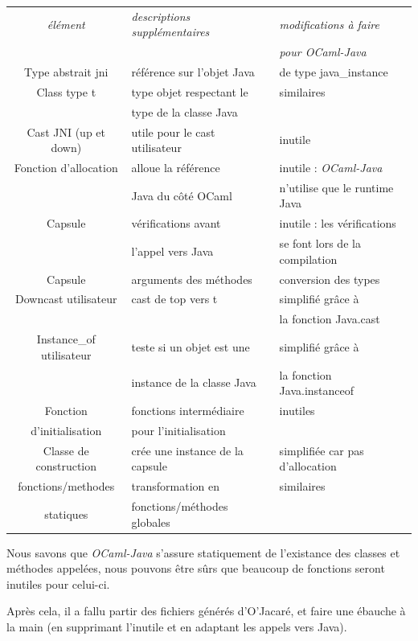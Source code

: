 \documentclass[a4paper, 11pt]{article}
\begin{document}
\begin{tabular}{|c|l|l|}
  \hline
  \emph{élément} & \emph{descriptions supplémentaires} & \emph{modifications à faire}\\
  & & \emph{pour OCaml-Java} \\
  \hline
  Type abstrait jni & référence sur l'objet Java & de type java\_instance\\
  \hline
  Class type t & type objet respectant le & similaires\\
  & type de la classe Java & \\
  \hline
  Cast JNI (up et down) & utile pour le cast utilisateur & inutile\\
  \hline
  Fonction d'allocation & alloue la référence & inutile : \emph{OCaml-Java} \\
  & Java du côté OCaml & n'utilise que le runtime Java\\
  \hline
  Capsule & vérifications avant & inutile : les vérifications \\
&l'appel vers Java & se font lors de la compilation \\
  \hline
  Capsule & arguments des méthodes & conversion des types \\
  \hline
  Downcast utilisateur & cast de top vers t & simplifié grâce à \\
  & & la fonction Java.cast\\
  \hline
  Instance\_of utilisateur & teste si un objet est une & simplifié grâce à \\
  & instance de la classe Java & la fonction Java.instanceof \\
  \hline
  Fonction  & fonctions intermédiaire  & inutiles \\
   d'initialisation &pour l'initialisation & \\
\hline
  Classe de construction & crée une instance de la capsule & simplifiée car pas d'allocation\\
  \hline
  fonctions/methodes& transformation en  & similaires \\
statiques & fonctions/méthodes globales & \\
  \hline
\end{tabular}

Nous savons que \emph{OCaml-Java} s'assure statiquement de l'existance des classes et méthodes appelées, nous pouvons être sûrs que beaucoup de fonctions seront inutiles pour celui-ci.

Après cela, il a fallu partir des fichiers générés d'O'Jacaré, et faire une ébauche à la main (en supprimant l'inutile et en adaptant les appels vers Java).
\end{document}
